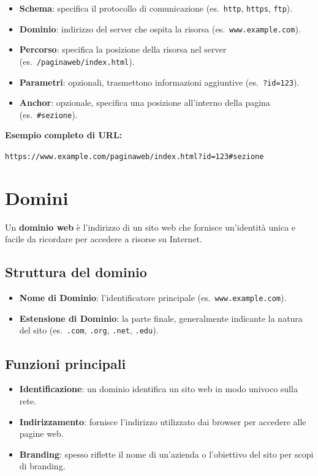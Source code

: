 \begin{itemize}
    \item \textbf{Schema}: specifica il protocollo di comunicazione (es.\ \texttt{http}, \texttt{https}, \texttt{ftp}).
    \item \textbf{Dominio}: indirizzo del server che ospita la risorsa (es.\ \texttt{www.example.com}).
    \item \textbf{Percorso}: specifica la posizione della risorsa nel server (es.\ \texttt{/paginaweb/index.html}).
    \item \textbf{Parametri}: opzionali, trasmettono informazioni aggiuntive (es.\ \texttt{?id=123}).
    \item \textbf{Anchor}: opzionale, specifica una posizione all'interno della pagina (es.\ \texttt{\#sezione}).
\end{itemize}

\textbf{Esempio completo di URL:}
\begin{center}
\texttt{https://www.example.com/paginaweb/index.html?id=123\#sezione}
\end{center}

\section{Domini}

Un \textbf{dominio web} è l'indirizzo di un sito web che fornisce un'identità unica e facile da ricordare per accedere a risorse su Internet.

\subsection{Struttura del dominio}

\begin{itemize}
    \item \textbf{Nome di Dominio}: l'identificatore principale (es.\ \texttt{www.example.com}).
    \item \textbf{Estensione di Dominio}: la parte finale, generalmente indicante la natura del sito (es.\ \texttt{.com}, \texttt{.org}, \texttt{.net}, \texttt{.edu}).
\end{itemize}

\subsection{Funzioni principali}

\begin{itemize}
    \item \textbf{Identificazione}: un dominio identifica un sito web in modo univoco sulla rete.
    \item \textbf{Indirizzamento}: fornisce l'indirizzo utilizzato dai browser per accedere alle pagine web.
    \item \textbf{Branding}: spesso riflette il nome di un'azienda o l'obiettivo del sito per scopi di branding.
\end{itemize}


